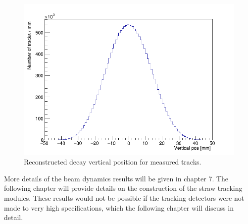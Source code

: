 \begin{figure}[th]
\centering
\includegraphics[scale=0.4]{Figures/VerticalPosition_.png}
\decoRule
\caption{Reconstructed decay vertical position for measured tracks.}
\label{fig:VerticalPosition}
\end{figure}

More details of the beam dynamics results will be given in chapter 7. The following chapter will provide details on the construction of the straw tracking modules. These results would not be possible if the tracking detectors were not made to very high specifications, which the following chapter will discuss in detail.



